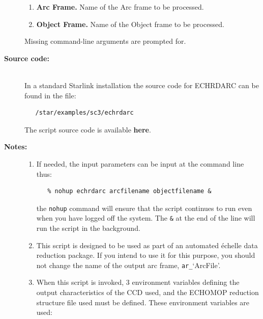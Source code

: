 \documentclass[twoside,11pt]{article}
\newcommand{\htmlref}[2]{#1}
\newenvironment{latexonly}{}{}
\renewcommand{\_}{\texttt{\symbol{95}}}
\begin{document}
\begin{description}
\begin{enumerate}

\item {\bf Arc Frame.}
      Name of the Arc frame to be processed.

\item {\bf Object Frame.}
      Name of the Object frame to be processed.

\end{enumerate}

     Missing command-line arguments are prompted for.

\item [{\bf Source code:}] \mbox{} \\
\begin{latexonly}
In a standard Starlink installation the source code for ECHRDARC can be found
in the file:
\begin{verbatim}
   /star/examples/sc3/echrdarc
\end{verbatim}
\end{latexonly}
\begin{htmlonly}
      The script source code is available
      \htmlref{{\bf here}}{se_echrdarc_source}.
\end{htmlonly}

\item [{\bf Notes:}] \mbox{}
\begin{enumerate}

\item If needed, the input parameters can be input at the command
      line thus:

\begin{verbatim}
   % nohup echrdarc arcfilename objectfilename &
\end{verbatim}

      the \verb+nohup+ command will ensure that the script continues
      to run even when you have logged off the system.  The \verb+&+ at
      the end of the line will run the script in the background.

\item This script is designed to be used as part of an automated
      \'{e}chelle data reduction package.  If you intend to use it
      for this purpose, you should not change the name of the output
      arc frame, \verb+ar_+`ArcFile'.

\item When this script is invoked, 3 environment variables defining
      the output characteristics of the CCD used, and the ECHOMOP
      reduction structure file used must be defined.
      These environment variables are used:


\end{enumerate}
\end{description}
\end{document}

